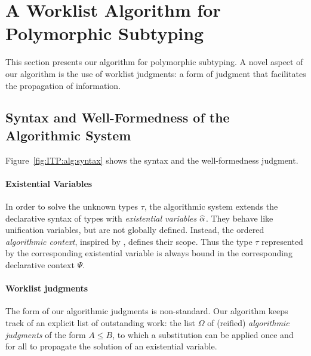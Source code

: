 \section{A Worklist Algorithm for Polymorphic Subtyping}\label{algorithmic_subtyping}

This section presents our algorithm for polymorphic
subtyping. A novel aspect of our algorithm is the use of worklist
judgments: a form of judgment that facilitates the propagation 
of information. 


\subsection{Syntax and Well-Formedness of the Algorithmic System}
Figure~\ref{fig:ITP:alg:syntax} shows the
syntax and the well-formedness judgment.  

\paragraph{Existential Variables}
In order to solve the unknown types $\tau$, the algorithmic system extends the
declarative syntax of types with \emph{existential variables} $\al$.  They
behave like unification variables, but are not globally defined. Instead, the
ordered \emph{algorithmic context}, inspired by \citet{dunfield2013complete},
defines their scope. Thus 
the type $\tau$ represented by the corresponding existential variable is
always bound in the corresponding declarative context $\Psi$.

\paragraph{Worklist judgments} The form of our algorithmic judgments is
non-standard. 
Our algorithm keeps track of an explicit list of
outstanding work: the list $\Omega$ of (reified) \emph{algorithmic judgments} 
of the form $A \leq B$,
to which a substitution can be applied once and for all to propagate the solution
of an existential variable. 

